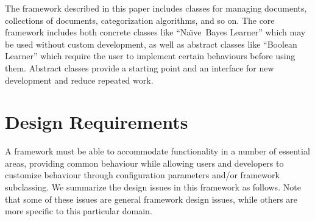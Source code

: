 \documentclass[twocolumn]{article}
\newcommand{\naive}{Na\"\i ve}
\begin{document}
The framework described in this paper includes classes for managing
documents, collections of documents, categorization algorithms, and so
on.  The core framework includes both concrete classes like ``\naive\
Bayes Learner'' which may be used without custom development, as
well as abstract classes like ``Boolean Learner'' which require the
user to implement certain behaviours before using them.  Abstract
classes provide a starting point and an interface for new development
and reduce repeated work.


\section{Design Requirements}

A framework must be able to accommodate functionality in a number of
essential areas, providing common behaviour while allowing users and
developers to customize behaviour through configuration parameters
and/or framework subclassing.  We summarize the design issues in this
framework as follows.  Note that some of these issues are general
framework design issues, while others are more specific to this
particular domain.
\end{document}
